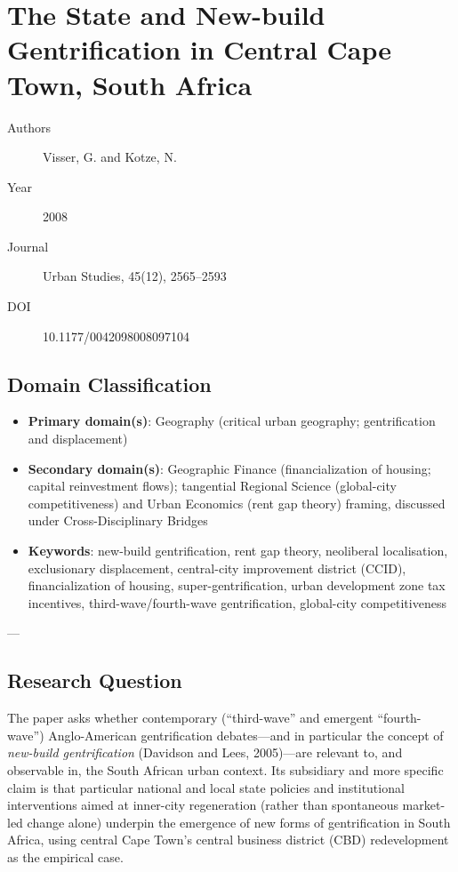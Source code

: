 \section{The State and New-build Gentrification in Central Cape Town, South Africa}

\begin{description}
  \item[Authors] Visser, G. and Kotze, N.
  \item[Year] 2008
  \item[Journal] Urban Studies, 45(12), 2565--2593
  \item[DOI] 10.1177/0042098008097104
\end{description}

\subsection*{Domain Classification}

\begin{itemize}
  \item \textbf{Primary domain(s)}: Geography (critical urban geography; gentrification and displacement)
  \item \textbf{Secondary domain(s)}: Geographic Finance (financialization of housing; capital reinvestment flows); tangential Regional Science (global-city competitiveness) and Urban Economics (rent gap theory) framing, discussed under Cross-Disciplinary Bridges
  \item \textbf{Keywords}: new-build gentrification, rent gap theory, neoliberal localisation, exclusionary displacement, central-city improvement district (CCID), financialization of housing, super-gentrification, urban development zone tax incentives, third-wave/fourth-wave gentrification, global-city competitiveness
\end{itemize}

---

\subsection*{Research Question}

The paper asks whether contemporary (``third-wave'' and emergent ``fourth-wave'') Anglo-American gentrification debates---and in particular the concept of \emph{new-build gentrification} (Davidson and Lees, 2005)---are relevant to, and observable in, the South African urban context. Its subsidiary and more specific claim is that particular national and local state policies and institutional interventions aimed at inner-city regeneration (rather than spontaneous market-led change alone) underpin the emergence of new forms of gentrification in South Africa, using central Cape Town's central business district (CBD) redevelopment as the empirical case.

